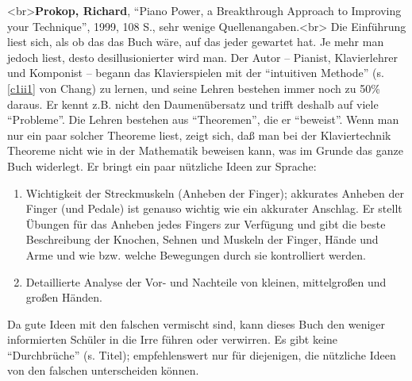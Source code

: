 \label{Prokop}

<br>\textbf{Prokop, Richard}, \enquote{Piano Power, a Breakthrough Approach to Improving your Technique}, 1999, 108 S., sehr wenige Quellenangaben.<br>
Die Einführung liest sich, als ob das das Buch wäre, auf das jeder gewartet hat.
Je mehr man jedoch liest, desto desillusionierter wird man.
Der Autor -- Pianist, Klavierlehrer und Komponist -- begann das Klavierspielen mit der \enquote{intuitiven Methode} (s. \hyperref[c1ii1]{\autoref{c1ii1}} von Chang) zu lernen, und seine Lehren bestehen immer noch zu 50\% daraus.
Er kennt z.B. nicht den Daumenübersatz und trifft deshalb auf viele \enquote{Probleme}.
Die Lehren bestehen aus \enquote{Theoremen}, die er \enquote{beweist}.
Wenn man nur ein paar solcher Theoreme liest, zeigt sich, daß man bei der Klaviertechnik Theoreme nicht wie in der Mathematik beweisen kann, was im Grunde das ganze Buch widerlegt.
Er bringt ein paar nützliche Ideen zur Sprache:

\begin{enumerate} 
 \item Wichtigkeit der Streckmuskeln (Anheben der Finger); akkurates Anheben der Finger (und Pedale) ist genauso wichtig wie ein akkurater Anschlag.
Er stellt Übungen für das Anheben jedes Fingers zur Verfügung und gibt die beste Beschreibung der Knochen, Sehnen und Muskeln der Finger, Hände und Arme und wie bzw. welche Bewegungen durch sie kontrolliert werden.
 \item Detaillierte Analyse der Vor- und Nachteile von kleinen, mittelgroßen und großen Händen.
\end{enumerate}
Da gute Ideen mit den falschen vermischt sind, kann dieses Buch den weniger informierten Schüler in die Irre führen oder verwirren.
Es gibt keine \enquote{Durchbrüche} (s. Titel); empfehlenswert nur für diejenigen, die nützliche Ideen von den falschen unterscheiden können.


\label{Richman}

